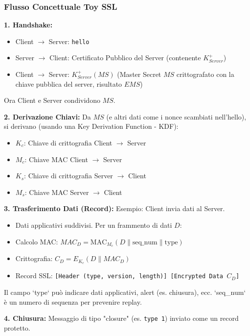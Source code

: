 \subsubsection{Flusso Concettuale Toy SSL}
\label{ssubsec:toy_ssl_flow}
\textbf{1. Handshake:}
\begin{itemize}
    \item Client $\rightarrow$ Server: \texttt{hello}
    \item Server $\rightarrow$ Client: Certificato Pubblico del Server (contenente $K_{Server}^+$)
    \item Client $\rightarrow$ Server: $K_{Server}^+(MS)$ (Master Secret $MS$ crittografato con la chiave pubblica del server, risultato $EMS$)
\end{itemize}
Ora Client e Server condividono $MS$.

\textbf{2. Derivazione Chiavi:}
Da $MS$ (e altri dati come i nonce scambiati nell'hello), si derivano (usando una Key Derivation Function - KDF):
\begin{itemize}
    \item $K_c$: Chiave di crittografia Client $\rightarrow$ Server
    \item $M_c$: Chiave MAC Client $\rightarrow$ Server
    \item $K_s$: Chiave di crittografia Server $\rightarrow$ Client
    \item $M_s$: Chiave MAC Server $\rightarrow$ Client
\end{itemize}

\textbf{3. Trasferimento Dati (Record):}
Esempio: Client invia dati al Server.
\begin{itemize}
    \item Dati applicativi suddivisi. Per un frammento di dati $D$:
    \item Calcolo MAC: $MAC_D = \text{MAC}_{M_c}(D \mathbin{\|} \text{seq_num} \mathbin{\|} \text{type})$
    \item Crittografia: $C_D = E_{K_c}(D \mathbin{\|} MAC_D)$
    \item Record SSL: \texttt{[Header (type, version, length)] [Encrypted Data $C_D$]}
\end{itemize}
Il campo `type` può indicare dati applicativi, alert (es. chiusura), ecc. `seq_num` è un numero di sequenza per prevenire replay.

\textbf{4. Chiusura:}
Messaggio di tipo "closure" (es. \texttt{type 1}) inviato come un record protetto.

